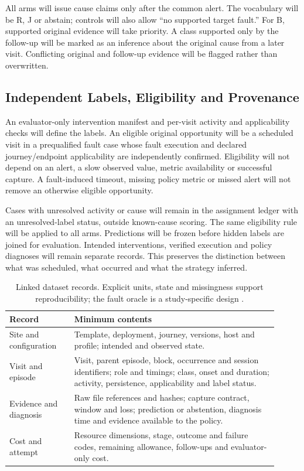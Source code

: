 All arms will issue cause claims only after the common alert. The vocabulary will be R, J or abstain; controls will also allow ``no supported target fault.'' For B, supported original evidence will take priority. A class supported only by the follow-up will be marked as an inference about the original cause from a later visit. Conflicting original and follow-up evidence will be flagged rather than overwritten.

\subsection{Independent Labels, Eligibility and Provenance}

An evaluator-only intervention manifest and per-visit activity and applicability checks will define the labels. An eligible original opportunity will be a scheduled visit in a prequalified fault case whose fault execution and declared journey/endpoint applicability are independently confirmed. Eligibility will not depend on an alert, a slow observed value, metric availability or successful capture. A fault-induced timeout, missing policy metric or missed alert will not remove an otherwise eligible opportunity.

Cases with unresolved activity or cause will remain in the assignment ledger with an unresolved-label status, outside known-cause scoring. The same eligibility rule will be applied to all arms. Predictions will be frozen before hidden labels are joined for evaluation. Intended interventions, verified execution and policy diagnoses will remain separate records. This preserves the distinction between what was scheduled, what occurred and what the strategy inferred.

\begin{table}[htbp]
\centering
\caption{Linked dataset records. Explicit units, state and missingness support reproducibility; the fault oracle is a study-specific design \parencite{RB93JMBB,B9FIJAKE,WF5NM72E}.}
\label{tab:dataset-schema}
\begin{tabular}{p{0.22\linewidth}p{0.69\linewidth}}
\toprule
Record & Minimum contents \\
\midrule
Site and configuration & Template, deployment, journey, versions, host and profile; intended and observed state. \\
Visit and episode & Visit, parent episode, block, occurrence and session identifiers; role and timings; class, onset and duration; activity, persistence, applicability and label status. \\
Evidence and diagnosis & Raw file references and hashes; capture contract, window and loss; prediction or abstention, diagnosis time and evidence available to the policy. \\
Cost and attempt & Resource dimensions, stage, outcome and failure codes, remaining allowance, follow-ups and evaluator-only cost. \\
\bottomrule
\end{tabular}
\end{table}

